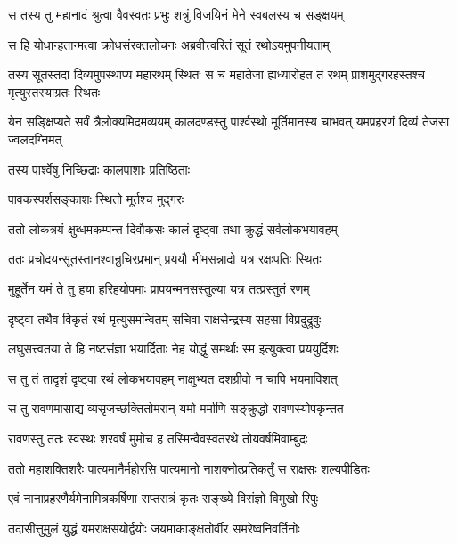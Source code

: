 
\twolineshloka
{स तस्य तु महानादं श्रुत्वा वैवस्वतः प्रभुः}
{शत्रुं विजयिनं मेने स्वबलस्य च सङ्क्षयम्} %

\twolineshloka
{स हि योधान्हतान्मत्वा क्रोधसंरक्तलोचनः}
{अब्रवीत्त्वरितं सूतं रथोऽयमुपनीयताम्} %

\threelineshloka
{तस्य सूतस्तदा दिव्यमुपस्थाप्य महारथम्}
{स्थितः स च महातेजा ह्यध्यारोहत तं रथम्}
{प्राशमुद्गरहस्तश्च मृत्युस्तस्याग्रतः स्थितः} %

\threelineshloka
{येन सङ्क्षिप्यते सर्वं त्रैलोक्यमिदमव्ययम्}
{कालदण्डस्तु पार्श्वस्थो मूर्तिमानस्य चाभवत्}
{यमप्रहरणं दिव्यं तेजसा ज्वलदग्निमत्} %

\onelineshloka
{तस्य पार्श्वेषु निच्छिद्राः कालपाशाः प्रतिष्ठिताः} %

\onelineshloka
{पावकस्पर्शसङ्काशः स्थितो मूर्तश्च मुद्गरः} %

\twolineshloka
{ततो लोकत्रयं क्षुब्धमकम्पन्त दिवौकसः}
{कालं दृष्ट्वा तथा क्रुद्धं सर्वलोकभयावहम्} %

\twolineshloka
{ततः प्रचोदयन्सूतस्तानश्वान्रुचिरप्रभान्}
{प्रययौ भीमसन्नादो यत्र रक्षःपतिः स्थितः} %

\twolineshloka
{मुहूर्तेन यमं ते तु हया हरिहयोपमाः}
{प्रापयन्मनसस्तुल्या यत्र तत्प्रस्तुतं रणम्} %

\twolineshloka
{दृष्ट्वा तथैव विकृतं रथं मृत्युसमन्वितम्}
{सचिवा राक्षसेन्द्रस्य सहसा विप्रदुद्रुवुः} %

\twolineshloka
{लघुसत्त्वतया ते हि नष्टसंज्ञा भयार्दिताः}
{नेह योद्धुं समर्थाः स्म इत्युक्त्वा प्रययुर्दिशः} %

\twolineshloka
{स तु तं तादृशं दृष्ट्वा रथं लोकभयावहम्}
{नाक्षुभ्यत दशग्रीवो न चापि भयमाविशत्} %

\twolineshloka
{स तु रावणमासाद्य व्यसृजच्छक्तितोमरान्}
{यमो मर्माणि सङ्क्रुद्धो रावणस्योपकृन्तत} %

\twolineshloka
{रावणस्तु ततः स्वस्थः शरवर्षं मुमोच ह}
{तस्मिन्वैवस्वतरथे तोयवर्षमिवाम्बुदः} %

\twolineshloka
{ततो महाशक्तिशरैः पात्यमानैर्महोरसि पात्यमानो}
{नाशक्नोत्प्रतिकर्तुं स राक्षसः शल्यपीडितः} %

\twolineshloka
{एवं नानाप्रहरणैर्यमेनामित्रकर्षिणा}
{सप्तरात्रं कृतः सङ्ख्ये विसंज्ञो विमुखो रिपुः} %

\twolineshloka
{तदासीत्तुमुलं युद्धं यमराक्षसयोर्द्वयोः}
{जयमाकाङ्क्षतोर्वीर समरेष्वनिवर्तिनोः} %

